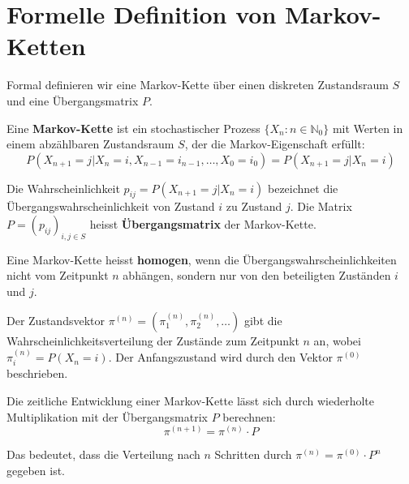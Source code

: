\chapter{Formelle Definition von Markov-Ketten}\label{ch:markov-formal}

Formal definieren wir eine Markov-Kette über einen diskreten Zustandsraum $S$ und eine Übergangsmatrix $P$.

\begin{mydefinition}
    Eine \textbf{Markov-Kette} ist ein stochastischer Prozess $\{X_n : n \in \mathbb{N}_0\}$ mit Werten in einem abzählbaren Zustandsraum $S$, der die Markov-Eigenschaft erfüllt:
    \[
        P(X_{n+1} = j | X_n = i, X_{n-1} = i_{n-1}, \ldots, X_0 = i_0) = P(X_{n+1} = j | X_n = i)
    \]

    Die Wahrscheinlichkeit $p_{ij} = P(X_{n+1} = j | X_n = i)$ bezeichnet die Übergangswahrscheinlichkeit von Zustand $i$ zu Zustand $j$. Die Matrix $P = (p_{ij})_{i,j \in S}$ heisst \textbf{Übergangsmatrix} der Markov-Kette.

    Eine Markov-Kette heisst \textbf{homogen}, wenn die Übergangswahrscheinlichkeiten nicht vom Zeitpunkt $n$ abhängen, sondern nur von den beteiligten Zuständen $i$ und $j$.
\end{mydefinition}

Der Zustandsvektor $\pi^{(n)} = (\pi_1^{(n)}, \pi_2^{(n)}, \ldots)$ gibt die Wahrscheinlichkeitsverteilung der Zustände zum Zeitpunkt $n$ an, wobei $\pi_i^{(n)} = P(X_n = i)$. Der Anfangszustand wird durch den Vektor $\pi^{(0)}$ beschrieben.

Die zeitliche Entwicklung einer Markov-Kette lässt sich durch wiederholte Multiplikation mit der Übergangsmatrix $P$ berechnen:
\[
    \pi^{(n+1)} = \pi^{(n)} \cdot P
\]

Das bedeutet, dass die Verteilung nach $n$ Schritten durch $\pi^{(n)} = \pi^{(0)} \cdot P^n$ gegeben ist.